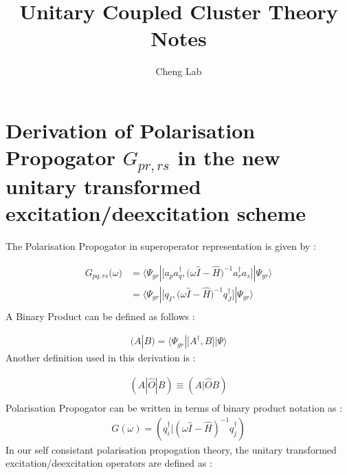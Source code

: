 \documentclass[11pt, oneside]{article}   	%
\title{Unitary Coupled Cluster Theory Notes}
\author{Cheng Lab}
\begin{document}
\maketitle

\section{Derivation of Polarisation Propogator $G_{pr,rs}$ in  the new unitary transformed excitation/deexcitation scheme}
The Polarisation Propogator in superoperator representation is given by :

\begin{equation*}\label{eq:propogator}
  \begin{aligned}
    G_{pq,rs}\big(\omega\big)&=\big \langle \Psi_{gr} |\big[ a_p a_q^\dagger , \big(\omega \hat I-\hat H \big)^{-1} a_r^\dagger a_s \big] | \Psi_{gr}\big \rangle \\
   & =\big \langle \Psi_{gr} |\big[ q_I , \big(\omega \hat I-\hat H \big)^{-1} q_J^\dagger \big] | \Psi_{gr}\big \rangle \\ 
  \end{aligned}
\end{equation*}
A Binary Product can be defined as follows :

\begin{equation*}\label{eq:binary product}
  \begin{aligned}
    (A|B)=\big \langle \Psi_{gr}|\big[A^\dagger,B]|\Psi\rangle
  \end{aligned}
\end{equation*}
Another definition used in this derivation is :

\begin{equation*}\label{eq:superoperator}
  \begin{aligned}
    (A|\hat O |B)\equiv (A|\hat O B)\\
  \end{aligned}
\end{equation*}
Polarisation Propogator can be written in terms of binary product notation as :
\begin{equation*}\label{eq:superoperator}
  \begin{aligned}
    G(\omega)=(q_i^\dagger|(\omega \hat I - \hat H)^{-1}q_j^\dagger )
  \end{aligned}
\end{equation*}
In our self consistant polarisation propogation theory, the unitary transformed excitation/deexcitation operators are defined as :
\end{document}
